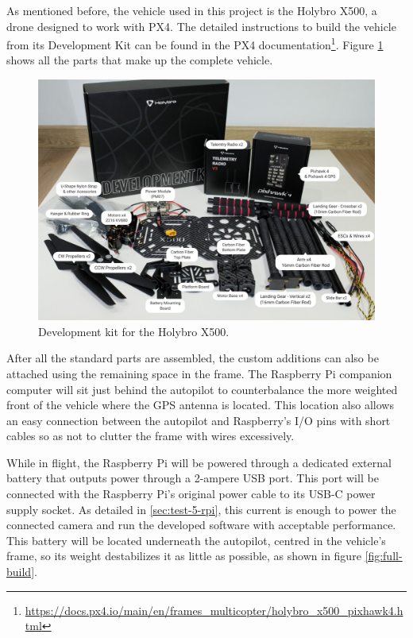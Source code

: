 

As mentioned before, the vehicle used in this project is the Holybro X500, a drone designed to work with PX4.
The detailed instructions to build the vehicle from its Development Kit can be found in the PX4 documentation\footnote{\url{https://docs.px4.io/main/en/frames_multicopter/holybro_x500_pixhawk4.html}}.
Figure \ref{fig:x500-dev-kit} shows all the parts that make up the complete vehicle.

\begin{figure}
  \centering
  \includegraphics[width=.6\textwidth, keepaspectratio]{img/x500-dev-kit.jpg}
  \caption{Development kit for the Holybro X500.}
  \label{fig:x500-dev-kit}
\end{figure}


After all the standard parts are assembled, the custom additions can also be attached using the remaining space in the frame.
The Raspberry Pi companion computer will sit just behind the autopilot to counterbalance the more weighted front of the vehicle where the GPS antenna is located.
This location also allows an easy connection between the autopilot and Raspberry's I/O pins with short cables so as not to clutter the frame with wires excessively.

While in flight, the Raspberry Pi will be powered through a dedicated external battery that outputs power through a 2-ampere USB port.
This port will be connected with the Raspberry Pi's original power cable to its USB-C power supply socket.
As detailed in \ref{sec:test-5-rpi}, this current is enough to power the connected camera and run the developed software with acceptable performance.
This battery will be located underneath the autopilot, centred in the vehicle's frame, so its weight destabilizes it as little as possible, as shown in figure \ref{fig:full-build}.

